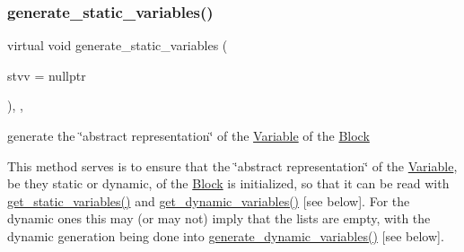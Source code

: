 \subsubsection{\texorpdfstring{generate\+\_\+static\+\_\+variables()}{generate\_static\_variables()}}
{\footnotesize\ttfamily virtual void generate\+\_\+static\+\_\+variables (\begin{DoxyParamCaption}\item[{\mbox{\hyperlink{class_s_m_spp__di__unipi__it_1_1_configuration}{Configuration}} $\ast$}]{stvv = {\ttfamily nullptr} }\end{DoxyParamCaption})\hspace{0.3cm}{\ttfamily [final]}, {\ttfamily [override]}, {\ttfamily [virtual]}}



generate the \char`\"{}abstract representation\char`\"{} of the \mbox{\hyperlink{class_s_m_spp__di__unipi__it_1_1_variable}{Variable}} of the \mbox{\hyperlink{class_s_m_spp__di__unipi__it_1_1_block}{Block}} 

This method serves is to ensure that the \char`\"{}abstract representation\char`\"{} of the \mbox{\hyperlink{class_s_m_spp__di__unipi__it_1_1_variable}{Variable}}, be they static or dynamic, of the \mbox{\hyperlink{class_s_m_spp__di__unipi__it_1_1_block}{Block}} is initialized, so that it can be read with \mbox{\hyperlink{class_s_m_spp__di__unipi__it_1_1_block_a6ca8b345bb506a8ac45eef39887bebea}{get\+\_\+static\+\_\+variables()}} and \mbox{\hyperlink{class_s_m_spp__di__unipi__it_1_1_block_a9c17adfb0c344b44e163d40f7fc6926f}{get\+\_\+dynamic\+\_\+variables()}} \mbox{[}see below\mbox{]}. For the dynamic ones this may (or may not) imply that the lists are empty, with the dynamic generation being done into \mbox{\hyperlink{class_s_m_spp__di__unipi__it_1_1_block_ab90d0f60518eee75370e29c95bae4522}{generate\+\_\+dynamic\+\_\+variables()}} \mbox{[}see below\mbox{]}.


